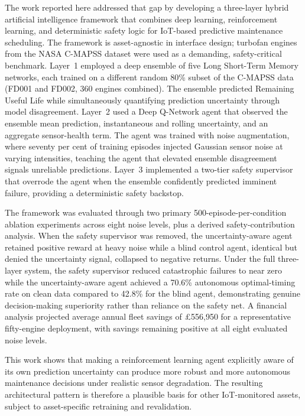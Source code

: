 \documentclass[12pt,a4paper]{report}
\begin{document}
The work reported here addressed that gap by developing a three-layer hybrid artificial intelligence framework that combines deep learning, reinforcement learning, and deterministic safety logic for IoT-based predictive maintenance scheduling. The framework is asset-agnostic in interface design; turbofan engines from the NASA C-MAPSS dataset were used as a demanding, safety-critical benchmark. Layer~1 employed a deep ensemble of five Long Short-Term Memory networks, each trained on a different random 80\% subset of the C-MAPSS data (FD001 and FD002, 360 engines combined). The ensemble predicted Remaining Useful Life while simultaneously quantifying prediction uncertainty through model disagreement. Layer~2 used a Deep Q-Network agent that observed the ensemble mean prediction, instantaneous and rolling uncertainty, and an aggregate sensor-health term. The agent was trained with noise augmentation, where seventy per cent of training episodes injected Gaussian sensor noise at varying intensities, teaching the agent that elevated ensemble disagreement signals unreliable predictions. Layer~3 implemented a two-tier safety supervisor that overrode the agent when the ensemble confidently predicted imminent failure, providing a deterministic safety backstop.

The framework was evaluated through two primary 500-episode-per-condition ablation experiments across eight noise levels, plus a derived safety-contribution analysis. When the safety supervisor was removed, the uncertainty-aware agent retained positive reward at heavy noise while a blind control agent, identical but denied the uncertainty signal, collapsed to negative returns. Under the full three-layer system, the safety supervisor reduced catastrophic failures to near zero while the uncertainty-aware agent achieved a 70.6\% autonomous optimal-timing rate on clean data compared to 42.8\% for the blind agent, demonstrating genuine decision-making superiority rather than reliance on the safety net. A financial analysis projected average annual fleet savings of \pounds556,950 for a representative fifty-engine deployment, with savings remaining positive at all eight evaluated noise levels.

This work shows that making a reinforcement learning agent explicitly aware of its own prediction uncertainty can produce more robust and more autonomous maintenance decisions under realistic sensor degradation. The resulting architectural pattern is therefore a plausible basis for other IoT-monitored assets, subject to asset-specific retraining and revalidation.
\end{document}
